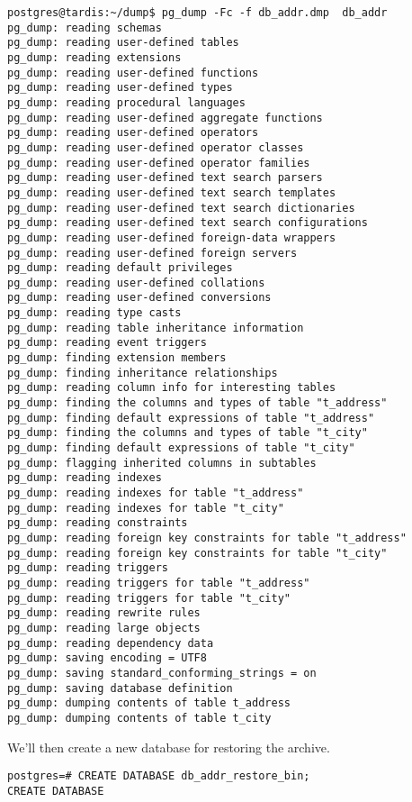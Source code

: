 \begin{verbatim}
postgres@tardis:~/dump$ pg_dump -Fc -f db_addr.dmp  db_addr
pg_dump: reading schemas
pg_dump: reading user-defined tables
pg_dump: reading extensions
pg_dump: reading user-defined functions
pg_dump: reading user-defined types
pg_dump: reading procedural languages
pg_dump: reading user-defined aggregate functions
pg_dump: reading user-defined operators
pg_dump: reading user-defined operator classes
pg_dump: reading user-defined operator families
pg_dump: reading user-defined text search parsers
pg_dump: reading user-defined text search templates
pg_dump: reading user-defined text search dictionaries
pg_dump: reading user-defined text search configurations
pg_dump: reading user-defined foreign-data wrappers
pg_dump: reading user-defined foreign servers
pg_dump: reading default privileges
pg_dump: reading user-defined collations
pg_dump: reading user-defined conversions
pg_dump: reading type casts
pg_dump: reading table inheritance information
pg_dump: reading event triggers
pg_dump: finding extension members
pg_dump: finding inheritance relationships
pg_dump: reading column info for interesting tables
pg_dump: finding the columns and types of table "t_address"
pg_dump: finding default expressions of table "t_address"
pg_dump: finding the columns and types of table "t_city"
pg_dump: finding default expressions of table "t_city"
pg_dump: flagging inherited columns in subtables
pg_dump: reading indexes
pg_dump: reading indexes for table "t_address"
pg_dump: reading indexes for table "t_city"
pg_dump: reading constraints
pg_dump: reading foreign key constraints for table "t_address"
pg_dump: reading foreign key constraints for table "t_city"
pg_dump: reading triggers
pg_dump: reading triggers for table "t_address"
pg_dump: reading triggers for table "t_city"
pg_dump: reading rewrite rules
pg_dump: reading large objects
pg_dump: reading dependency data
pg_dump: saving encoding = UTF8
pg_dump: saving standard_conforming_strings = on
pg_dump: saving database definition
pg_dump: dumping contents of table t_address
pg_dump: dumping contents of table t_city

\end{verbatim}

We'll then create a new database for restoring the archive.

\begin{lstlisting}[style=pgsql]
postgres=# CREATE DATABASE db_addr_restore_bin;
CREATE DATABASE

\end{lstlisting}

